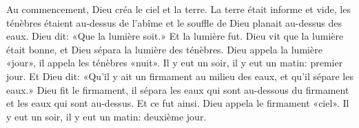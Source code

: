 Au commencement, Dieu créa le ciel et la terre.
La terre était informe et vide,
	les ténèbres étaient au-dessus de l’abîme
	et le souffle de Dieu planait au-dessus des eaux.
Dieu dit: «Que la lumière soit.» Et la lumière fut.
Dieu vit que la lumière était bonne,
	et Dieu sépara la lumière des ténèbres.
Dieu appela la lumière «jour», il appela les ténèbres «nuit».
Il y eut un soir, il y eut un matin: premier jour.
Et Dieu dit: «Qu’il y ait un firmament au milieu des eaux, et qu’il sépare les eaux.»
Dieu fit le firmament,
	il sépara les eaux qui sont au-dessous du firmament et les eaux qui sont au-dessus.
	Et ce fut ainsi.
Dieu appela le firmament «ciel».
Il y eut un soir, il y eut un matin: deuxième jour.

